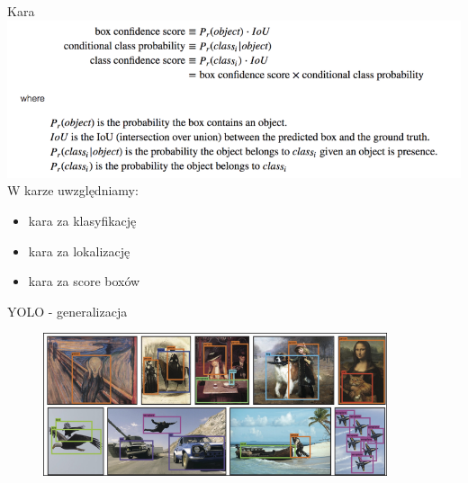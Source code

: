 \documentclass[11pt]{beamer}
\begin{document}
\begin{frame}{Kara}
\includegraphics[width=\textwidth]{grafika/confidence.png} \\
W karze uwzględniamy:
\begin{itemize}
    \item kara za klasyfikację
    \item kara za lokalizację
    \item kara za score boxów
\end{itemize}
\end{frame}


\begin{frame}{YOLO - generalizacja}
\begin{figure}
    \centering
    \includegraphics[width=0.9\textwidth]{grafika/yolo-natural.png}

\end{figure}
\end{frame}
\end{document}
